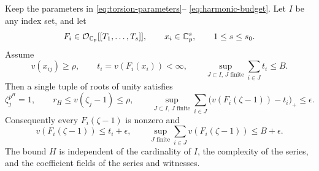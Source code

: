 \begin{theorem}
\label{thm:analytic-torsion-selector}
Keep the parameters in \eqref{eq:torsion-parameters}--
\eqref{eq:harmonic-budget}. Let $I$ be any index set, and let
\[
 F_i\in\mathcal O_{\mathbb C_p}[[T_1,\ldots,T_s]],\qquad
 x_i\in\mathbb C_p^s,\qquad 1\le s\le s_0.
\]
Assume
\[
 v(x_{ij})\ge\rho,\qquad
 t_i=v(F_i(x_i))<\infty,\qquad
 \sup_{J\subset I,\,J\text{ finite}}\sum_{i\in J}t_i\le B.
\]
Then a single tuple of roots of unity satisfies
\[
 \zeta_j^{p^H}=1,\qquad r_H\le v(\zeta_j-1)\le\rho,
 \qquad
 \boxed{\sup_{J\subset I,\,J\text{ finite}}
 \sum_{i\in J}\bigl(v(F_i(\zeta-1))-t_i\bigr)_+\le\epsilon.}
\]
Consequently every $F_i(\zeta-1)$ is nonzero and
\[
 v(F_i(\zeta-1))\le t_i+\epsilon,\qquad
 \sup_{J\text{ finite}}\sum_{i\in J}v(F_i(\zeta-1))\le B+\epsilon.
\]
The bound $H$ is independent of the cardinality of $I$, the complexity
of the series, and the coefficient fields of the series and witnesses.
\end{theorem}

